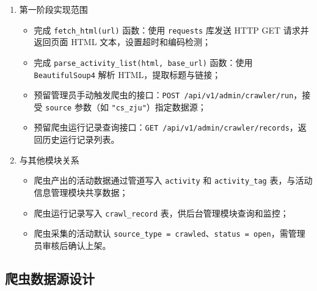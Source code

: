 \documentclass[UTF8,a4paper,12pt,fontset=none]{ctexrep}
\providecommand{\tightlist}{}
\begin{document}
\begin{enumerate}
  该数据类仅包含爬虫能从网页中可靠抽取的字段，其余字段（如 \texttt{category}、\texttt{college}、\texttt{tags}、\texttt{hot\_score}）由入库管道设置默认值或由管理员在后台补充。
\item
  第一阶段实现范围

  \begin{itemize}
  \tightlist
  \item
    完成 \texttt{fetch\_html(url)} 函数：使用 \texttt{requests} 库发送 HTTP GET 请求并返回页面 HTML 文本，设置超时和编码检测；
  \item
    完成 \texttt{parse\_activity\_list(html,\ base\_url)} 函数：使用 \texttt{BeautifulSoup4} 解析 HTML，提取标题与链接；
  \item
    预留管理员手动触发爬虫的接口：\texttt{POST\ /api/v1/admin/crawler/run}，接受 \texttt{source} 参数（如 \texttt{"cs\_zju"}）指定数据源；
  \item
    预留爬虫运行记录查询接口：\texttt{GET\ /api/v1/admin/crawler/records}，返回历史运行记录列表。
  \end{itemize}
\item
  与其他模块关系

  \begin{itemize}
  \tightlist
  \item
    爬虫产出的活动数据通过管道写入 \texttt{activity} 和 \texttt{activity\_tag} 表，与活动信息管理模块共享数据；
  \item
    爬虫运行记录写入 \texttt{crawl\_record} 表，供后台管理模块查询和监控；
  \item
    爬虫采集的活动默认 \texttt{source\_type\ =\ \textquotesingle{}crawled\textquotesingle{}}、\texttt{status\ =\ \textquotesingle{}open\textquotesingle{}}，需管理员审核后确认上架。
  \end{itemize}
\end{enumerate}

\subsection{爬虫数据源设计}\label{ux722cux866bux6570ux636eux6e90ux8bbeux8ba1}
\end{document}
